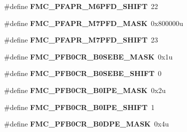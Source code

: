 \begin{DoxyCompactItemize}
\item 
\#define {\bfseries F\+M\+C\+\_\+\+P\+F\+A\+P\+R\+\_\+\+M6\+P\+F\+D\+\_\+\+S\+H\+I\+FT}~22\hypertarget{group__FMC__Register__Masks_ga5ff1d949214bab253e7b426ca8fb6884}{}\label{group__FMC__Register__Masks_ga5ff1d949214bab253e7b426ca8fb6884}

\item 
\#define {\bfseries F\+M\+C\+\_\+\+P\+F\+A\+P\+R\+\_\+\+M7\+P\+F\+D\+\_\+\+M\+A\+SK}~0x800000u\hypertarget{group__FMC__Register__Masks_gac0652379651a8388e65f2e96358b72f1}{}\label{group__FMC__Register__Masks_gac0652379651a8388e65f2e96358b72f1}

\item 
\#define {\bfseries F\+M\+C\+\_\+\+P\+F\+A\+P\+R\+\_\+\+M7\+P\+F\+D\+\_\+\+S\+H\+I\+FT}~23\hypertarget{group__FMC__Register__Masks_ga4589e8d60db033a3ab174e976a5d3dcf}{}\label{group__FMC__Register__Masks_ga4589e8d60db033a3ab174e976a5d3dcf}

\item 
\#define {\bfseries F\+M\+C\+\_\+\+P\+F\+B0\+C\+R\+\_\+\+B0\+S\+E\+B\+E\+\_\+\+M\+A\+SK}~0x1u\hypertarget{group__FMC__Register__Masks_ga9eede1bc45bf3cbaf00b4e9960f5e7eb}{}\label{group__FMC__Register__Masks_ga9eede1bc45bf3cbaf00b4e9960f5e7eb}

\item 
\#define {\bfseries F\+M\+C\+\_\+\+P\+F\+B0\+C\+R\+\_\+\+B0\+S\+E\+B\+E\+\_\+\+S\+H\+I\+FT}~0\hypertarget{group__FMC__Register__Masks_gac7bd1c5a4c5f35eb2d02351977e6a274}{}\label{group__FMC__Register__Masks_gac7bd1c5a4c5f35eb2d02351977e6a274}

\item 
\#define {\bfseries F\+M\+C\+\_\+\+P\+F\+B0\+C\+R\+\_\+\+B0\+I\+P\+E\+\_\+\+M\+A\+SK}~0x2u\hypertarget{group__FMC__Register__Masks_gab46173be15cdda210e83a041f8eeb809}{}\label{group__FMC__Register__Masks_gab46173be15cdda210e83a041f8eeb809}

\item 
\#define {\bfseries F\+M\+C\+\_\+\+P\+F\+B0\+C\+R\+\_\+\+B0\+I\+P\+E\+\_\+\+S\+H\+I\+FT}~1\hypertarget{group__FMC__Register__Masks_ga9fccb996200782cf4a1ec8d2418da2e5}{}\label{group__FMC__Register__Masks_ga9fccb996200782cf4a1ec8d2418da2e5}

\item 
\#define {\bfseries F\+M\+C\+\_\+\+P\+F\+B0\+C\+R\+\_\+\+B0\+D\+P\+E\+\_\+\+M\+A\+SK}~0x4u\hypertarget{group__FMC__Register__Masks_gaff35af9c8bc3c5cf2f6bf9dd76253a02}{}\label{group__FMC__Register__Masks_gaff35af9c8bc3c5cf2f6bf9dd76253a02}


\end{DoxyCompactItemize}
